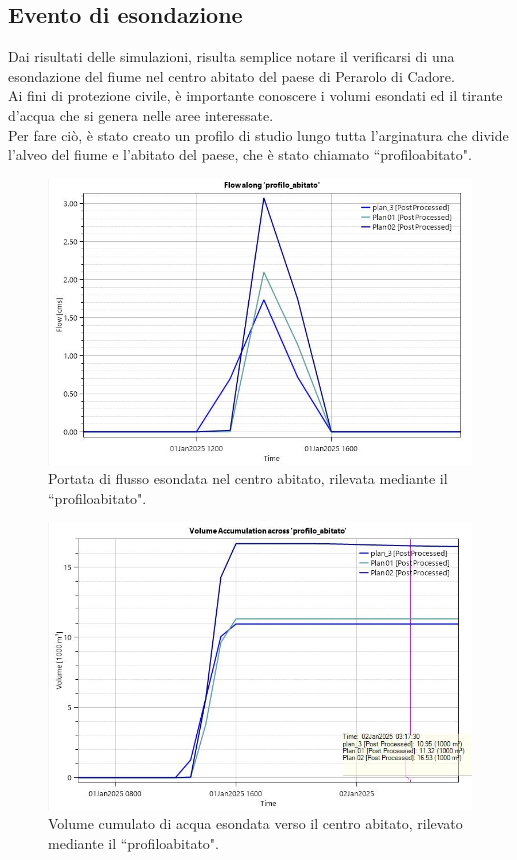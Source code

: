 \subsection{Evento di esondazione}
Dai risultati delle simulazioni, risulta semplice notare il verificarsi di una esondazione del fiume nel centro abitato del paese di Perarolo di Cadore.\\
Ai fini di protezione civile, è importante conoscere i volumi esondati ed il tirante d'acqua che si genera nelle aree interessate.\\
Per fare ciò, è stato creato un profilo di studio lungo tutta l'arginatura che divide l'alveo del fiume e l'abitato del paese, che è stato chiamato ``profilo\textunderscore abitato".

\begin{figure}[H] \centering
    \includegraphics[scale=0.5]{immagini/flow_centro_abitato.JPG}
    \caption{Portata di flusso esondata nel centro abitato, rilevata mediante il ``profilo\textunderscore abitato".}
    \label{figure:flow_centro_abitato}
\end{figure}

\begin{figure}[H] \centering
    \includegraphics[scale=0.5]{immagini/volume_accumulation_centro_abitato.JPG}
    \caption{Volume cumulato di acqua esondata verso il centro abitato, rilevato mediante il ``profilo\textunderscore abitato".}
    \label{figure:volume_accumulation_centro_abitato}
\end{figure}

